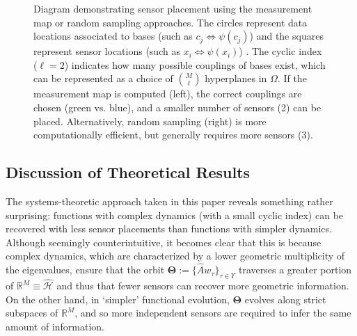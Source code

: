\documentclass[letterpaper,12pt,peerreviewca,draftcls]{IEEEtran}
\newcommand{\diagscale}{0.35}
\newcommand{\diagtexttop}{0.51}
\newcommand{\R}{\mathbb{R}}
\newcommand{\weight}{w}
\newcommand{\fspace}{\mathcal{H}}
\newcommand{\fmap}{\psi}
\newcommand{\empK}{\ensuremath{K}}
\newcommand{\dom}{\Omega}
\newcommand{\ncent}{M}
\newcommand{\Tset}{\Upsilon}
\newcommand{\fspaceApprox}{\widehat{\fspace}}
\newcommand{\minmeas}{\ell}
\newcommand{\dualop}{A}
\newcommand{\dualopApprox}{\widehat{\dualop}}
\newcommand{\empKShadFull}{\mathbf{\empK}}
\newcommand{\tindex}{\tau}
\newcommand{\orbit}{\boldsymbol{\Theta}}
\begin{document}
\begin{figure}[ht!]
\begin{minipage}{\textwidth}
\begin{minipage}{0.47\textwidth}
{{
  } %
  } %

  \end{minipage} 
  \end{minipage} 
  \caption{
  Diagram demonstrating sensor placement using the measurement map or random sampling approaches. 
  The circles represent data locations associated to bases (such as $c_j\Leftrightarrow\fmap(c_j)$) 
  and the squares represent sensor locations (such as $x_i\Leftrightarrow\fmap(x_i)$) .
  The cyclic index ($\minmeas=2$) indicates how many possible couplings of bases exist, 
  which can be represented 
  as a choice of $\binom{\ncent}{\minmeas}$ hyperplanes in $\dom$. If the measurement map is 
  computed (left), the correct couplings are chosen (green vs. blue), and a smaller number of sensors (2) can be placed.
  Alternatively, random sampling (right) is more computationally efficient, but generally
  requires more sensors (3). 
  }\label{fig:sensplace}
\end{figure}



\subsection{Discussion of Theoretical Results}\label{sec:discussion}
The systems-theoretic approach taken in this paper reveals something rather surprising: functions with complex dynamics (with a small cyclic index) can be recovered with less sensor placements than functions with simpler dynamics. Although seemingly counterintuitive, it becomes clear that this is because complex dynamics, which are characterized by a lower geometric multiplicity of the eigenvalues, ensure that the orbit $\orbit := \{\dualopApprox\weight_{\tindex}\}_{\tindex\in\Tset}$ traverses a greater portion of $\R^{\ncent} \equiv \fspaceApprox$ and thus that fewer sensors can recover more geometric information. On the other hand, in `simpler' functional evolution, $\orbit$ evolves along strict subspaces of $\R^{\ncent}$, and so more independent sensors are required to infer the same amount of information. 
\end{document}
